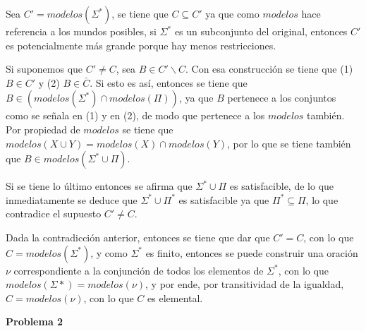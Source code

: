 \documentclass[letterpaper,10pt]{article}
\begin{document}
\begin{enumerate}
    Sea $C'=modelos(\Sigma^*)$, se tiene que $C \subseteq C'$ ya que como $modelos$ hace referencia a los mundos posibles, si $\Sigma^*$ es un subconjunto del original, entonces $C'$ es potencialmente más grande porque hay menos restricciones.

    Si suponemos que $C'\neq C$, sea $B \in C' \backslash C$. Con esa construcción se tiene que (1) $B \in C'$ y (2) $B \in \bar{C}$. Si esto es así, entonces se tiene que $B \in (modelos(\Sigma^*) \cap modelos(\Pi))$, ya que $B$ pertenece a los conjuntos como se señala en (1) y en (2), de modo que pertenece a los $modelos$ también. Por propiedad de $modelos$ se tiene que $modelos(X \cup Y) = modelos(X) \cap modelos(Y)$, por lo que se tiene también que $B \in modelos(\Sigma^* \cup \Pi)$.

    Si se tiene lo último entonces se afirma que $\Sigma^* \cup \Pi$ es satisfacible, de lo que inmediatamente se deduce que $\Sigma^* \cup \Pi^*$ es satisfacible ya que $\Pi^* \subseteq \Pi$, lo que contradice el supuesto $C'\neq C$.

    Dada la contradicción anterior, entonces se tiene que dar que $C' = C$, con lo que $C=modelos(\Sigma^*)$, y como $\Sigma^*$ es finito, entonces se puede construir una oración $\nu$ correspondiente a la conjunción de todos los elementos de $\Sigma^*$, con lo que $modelos(\Sigma*) = modelos(\nu)$, y por ende, por transitividad de la igualdad, $C=modelos(\nu)$, con lo que $C$ es elemental.

\end{enumerate}


\textbf{Problema 2}
\end{document}

